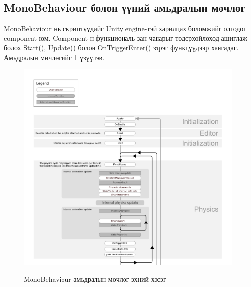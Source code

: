 \subsection{MonoBehaviour болон үүний амьдралын мөчлөг}
MonoBehaviour нь скриптүүдийг Unity engine-тэй харилцах боломжийг олгодог component юм. Component-н функциональ зан чанарыг тодорхойлоход ашиглаж болох Start(), Update() болон OnTriggerEnter() зэрэг функцүүдээр хангадаг.
Амьдралын мөчлөгийг \ref{fig:MonoBehaviourFlowChart1} үзүүлэв.
\begin{figure}[t]
	\centering
	\caption{MonoBehaviour амьдралын мөчлөг эхний хэсэг}
	\includegraphics[width=\textwidth]{./images/monobehaviour_flowchart_1.png}
	\label{fig:MonoBehaviourFlowChart1}
\end{figure}
